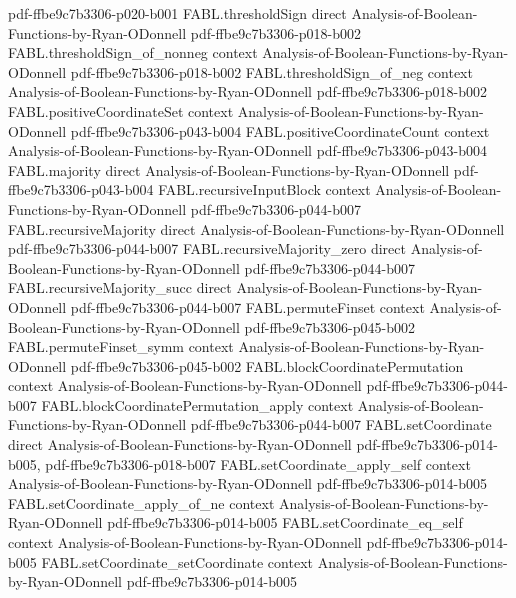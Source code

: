 \begin{theorem}
  {pdf-ffbe9c7b3306-p020-b001}
\proofstep
  {FABL.thresholdSign}
  {direct}
  {Analysis-of-Boolean-Functions-by-Ryan-ODonnell}
  {pdf-ffbe9c7b3306-p018-b002}
\proofstep
  {FABL.thresholdSign_of_nonneg}
  {context}
  {Analysis-of-Boolean-Functions-by-Ryan-ODonnell}
  {pdf-ffbe9c7b3306-p018-b002}
\proofstep
  {FABL.thresholdSign_of_neg}
  {context}
  {Analysis-of-Boolean-Functions-by-Ryan-ODonnell}
  {pdf-ffbe9c7b3306-p018-b002}
\proofstep
  {FABL.positiveCoordinateSet}
  {context}
  {Analysis-of-Boolean-Functions-by-Ryan-ODonnell}
  {pdf-ffbe9c7b3306-p043-b004}
\proofstep
  {FABL.positiveCoordinateCount}
  {context}
  {Analysis-of-Boolean-Functions-by-Ryan-ODonnell}
  {pdf-ffbe9c7b3306-p043-b004}
\proofstep
  {FABL.majority}
  {direct}
  {Analysis-of-Boolean-Functions-by-Ryan-ODonnell}
  {pdf-ffbe9c7b3306-p043-b004}
\proofstep
  {FABL.recursiveInputBlock}
  {context}
  {Analysis-of-Boolean-Functions-by-Ryan-ODonnell}
  {pdf-ffbe9c7b3306-p044-b007}
\proofstep
  {FABL.recursiveMajority}
  {direct}
  {Analysis-of-Boolean-Functions-by-Ryan-ODonnell}
  {pdf-ffbe9c7b3306-p044-b007}
\proofstep
  {FABL.recursiveMajority_zero}
  {direct}
  {Analysis-of-Boolean-Functions-by-Ryan-ODonnell}
  {pdf-ffbe9c7b3306-p044-b007}
\proofstep
  {FABL.recursiveMajority_succ}
  {direct}
  {Analysis-of-Boolean-Functions-by-Ryan-ODonnell}
  {pdf-ffbe9c7b3306-p044-b007}
\proofstep
  {FABL.permuteFinset}
  {context}
  {Analysis-of-Boolean-Functions-by-Ryan-ODonnell}
  {pdf-ffbe9c7b3306-p045-b002}
\proofstep
  {FABL.permuteFinset_symm}
  {context}
  {Analysis-of-Boolean-Functions-by-Ryan-ODonnell}
  {pdf-ffbe9c7b3306-p045-b002}
\proofstep
  {FABL.blockCoordinatePermutation}
  {context}
  {Analysis-of-Boolean-Functions-by-Ryan-ODonnell}
  {pdf-ffbe9c7b3306-p044-b007}
\proofstep
  {FABL.blockCoordinatePermutation_apply}
  {context}
  {Analysis-of-Boolean-Functions-by-Ryan-ODonnell}
  {pdf-ffbe9c7b3306-p044-b007}
\proofstep
  {FABL.setCoordinate}
  {direct}
  {Analysis-of-Boolean-Functions-by-Ryan-ODonnell}
  {pdf-ffbe9c7b3306-p014-b005,
    pdf-ffbe9c7b3306-p018-b007}
\proofstep
  {FABL.setCoordinate_apply_self}
  {context}
  {Analysis-of-Boolean-Functions-by-Ryan-ODonnell}
  {pdf-ffbe9c7b3306-p014-b005}
\proofstep
  {FABL.setCoordinate_apply_of_ne}
  {context}
  {Analysis-of-Boolean-Functions-by-Ryan-ODonnell}
  {pdf-ffbe9c7b3306-p014-b005}
\proofstep
  {FABL.setCoordinate_eq_self}
  {context}
  {Analysis-of-Boolean-Functions-by-Ryan-ODonnell}
  {pdf-ffbe9c7b3306-p014-b005}
\proofstep
  {FABL.setCoordinate_setCoordinate}
  {context}
  {Analysis-of-Boolean-Functions-by-Ryan-ODonnell}
  {pdf-ffbe9c7b3306-p014-b005}

\end{theorem}
